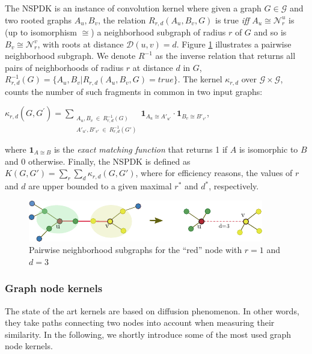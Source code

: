 \documentclass[review]{elsarticle}
\begin{document}
The NSPDK \cite{costa2010fast} is an instance of convolution kernel \cite{haussler1999convolution} where given a graph $G \in \mathcal{G}$ and two rooted graphs $A_u, B_v$, the relation $R_{r,d}(A_u, B_v, G)$ is true {\em iff} $A_u \cong \mathcal{N}_r^u$ is (up to isomorphism $\cong$) a neighborhood subgraph of radius $r$ of $G$ and so is $B_v \cong  \mathcal{N}_r^v$, with roots at distance $\mathcal{D}(u,v)= d$. Figure \ref{fig:nspdk} illustrates a pairwise neighborhood subgraph. We denote $R^{-1}$ as the inverse relation that returns all pairs of neighborhoods of radius $r$ at distance $d$ in $G$, $R^{-1}_{r,d}(G) = \lbrace A_u, B_v | R_{r,d}(A_u,B_v,G)=true\rbrace$. The kernel $\kappa_{r,d}$ over $\mathcal{G} \times \mathcal{G}$, counts the number of such fragments in common in two input graphs: 
\begin{center}
$\kappa_{r,d}(G,G^{'}) = 
\!\!\!\!\!\!\!\!\!\!\!\! 
\sum\limits_{\substack{A_u, B_v \ \in \ R_{r,d}^{-1}(G) \\ 
{A'}_{u'}, {B'}_{v'} \ \in \ R_{r,d}^{-1}(G')
}} \!\!\!\!\!\!\!\!\!\!\!\!  { { \textbf{1}_{A_{u} \cong A'_{u'}}} \cdot {
\textbf{1}_{B_{v} \cong B'_{v'}}} }$, 
\end{center} 
\noindent where $\textbf{1}_{A \cong B}$ is the \textit{exact matching function} that returns 1 if $A$ is
isomorphic to $B$ and 0 otherwise.  Finally, the NSPDK is defined as $K(G,G') = \sum\limits_{r}{\sum\limits_{d}{\kappa_{r,d}(G,G')}}$, where for efficiency reasons, the values of $r$ and $d$ are upper bounded to a given maximal $r^*$ and $d^*$, respectively.
\begin{figure}
\centering
\includegraphics[width=.9\textwidth]{nspdk}
\caption{Pairwise neighborhood subgraphs for the ``red'' node with $r=1$ and $d=3$}
\label{fig:nspdk}
\end{figure}

\subsubsection{Graph node kernels}
The state of the art kernels are based on diffusion phenomenon. In other words, they take paths connecting two nodes into account when measuring their similarity. In the following, we shortly introduce some of the most used graph node kernels.
\end{document}
